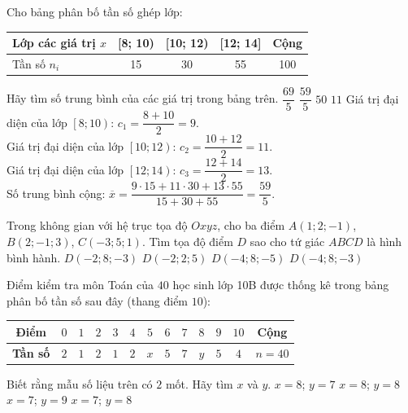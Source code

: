 \begin{ex}%
	Cho bảng phân bố tần số ghép lớp: 
\begin{center}
	\begin{tabular}{|l|c|c|c|c|}
		\hline
		{Lớp các giá trị $x$}&{[8; 10)}&{[10; 12)}&{[12; 14]}&{Cộng}\\
		\hline
		{Tần số $n_i$}&{15}&{30}&{55}&{100}\\
		\hline
	\end{tabular}	
\end{center}
Hãy tìm số trung bình của các giá trị trong bảng trên.
\choice
{$\dfrac{69}{5}$}
{\True$\dfrac{59}{5}$}
{$50$}
{$11$}
\loigiai
{Giá trị đại diện của lớp $\left[8; 10\right)$: $c_1=\dfrac{8 + 10}{2}=9$.\\ 
	Giá trị đại diện của lớp $\left[10; 12\right)$: $c_2=\dfrac{10 + 12}{2}=11$.\\ 
	Giá trị đại diện của lớp $\left[12; 14\right)$: $c_3=\dfrac{12 + 14}{2}=13$.\\ 
	Số trung bình cộng: $\overline{x}=\dfrac{9\cdot15 + 11\cdot30 + 13\cdot55}{15 + 30 + 55}=\dfrac{59}{5}$.
}
\end{ex}

\begin{ex}%
Trong không gian với hệ trục tọa độ $Oxyz$, cho ba điểm $A(1; 2;-1)$, $B(2;-1; 3)$, $C(-3; 5; 1)$. Tìm tọa độ điểm $D$ sao cho tứ giác $ABCD$ là hình bình hành. 
\choice
{$D(-2; 8;-3)$}
{$D(-2; 2; 5)$}
{$D(-4; 8;-5)$}
{\True $D(-4; 8;-3)$}
\end{ex}

\begin{ex}%
Điểm kiểm tra môn Toán của $40$ học sinh lớp 10B được thống kê trong bảng phân bố tần số sau đây (thang điểm $10$):
\begin{center}
	\begin{tabular}{|c|c|c|c|c|c|c|c|c|c|c|c|c|}
		\hline 
		\bf Điểm &$0$ &$1$&$2$&$3$&$4$&$5$&$6$&$7$&$8$&$9$&$10$& Cộng\\ 
		\hline
		\bf Tần số &$2$ &$1$&$2$&$1$&$2$&$x$&$5$&$7$&$y$&$5$&$4$& $n=40$\\
		\hline
	\end{tabular}
\end{center}
Biết rằng mẫu số liệu trên có $2$ mốt. Hãy tìm $x$ và $y$.
\choice
{$x=8$; $y=7$}
{\True$x=8$; $y=8$}
{$x=7$; $y=9$}
{$x=7$; $y=8$}
\end{ex}

